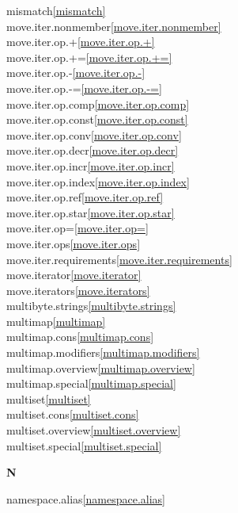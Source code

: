 \begin{multicols}{2}
mismatch\quad\ref{mismatch}\\
move.iter.nonmember\quad\ref{move.iter.nonmember}\\
move.iter.op.+\quad\ref{move.iter.op.+}\\
move.iter.op.+=\quad\ref{move.iter.op.+=}\\
move.iter.op.-\quad\ref{move.iter.op.-}\\
move.iter.op.-=\quad\ref{move.iter.op.-=}\\
move.iter.op.comp\quad\ref{move.iter.op.comp}\\
move.iter.op.const\quad\ref{move.iter.op.const}\\
move.iter.op.conv\quad\ref{move.iter.op.conv}\\
move.iter.op.decr\quad\ref{move.iter.op.decr}\\
move.iter.op.incr\quad\ref{move.iter.op.incr}\\
move.iter.op.index\quad\ref{move.iter.op.index}\\
move.iter.op.ref\quad\ref{move.iter.op.ref}\\
move.iter.op.star\quad\ref{move.iter.op.star}\\
move.iter.op=\quad\ref{move.iter.op=}\\
move.iter.ops\quad\ref{move.iter.ops}\\
move.iter.requirements\quad\ref{move.iter.requirements}\\
move.iterator\quad\ref{move.iterator}\\
move.iterators\quad\ref{move.iterators}\\
multibyte.strings\quad\ref{multibyte.strings}\\
multimap\quad\ref{multimap}\\
multimap.cons\quad\ref{multimap.cons}\\
multimap.modifiers\quad\ref{multimap.modifiers}\\
multimap.overview\quad\ref{multimap.overview}\\
multimap.special\quad\ref{multimap.special}\\
multiset\quad\ref{multiset}\\
multiset.cons\quad\ref{multiset.cons}\\
multiset.overview\quad\ref{multiset.overview}\\
multiset.special\quad\ref{multiset.special}\\
\par \textbf{N}\par
namespace.alias\quad\ref{namespace.alias}\\

\end{multicols}
